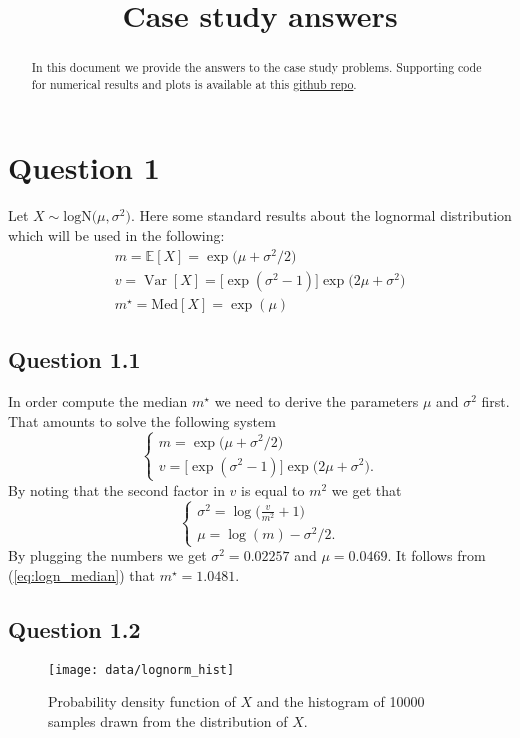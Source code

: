 \documentclass[12pt, a4paper]{article}
\title{Case study answers}
\author{}
\theoremstyle{problemstyle}
\newcommand{\Var}[1]{\operatorname{Var}\left[#1\right]}
\begin{document}
\maketitle

\begin{abstract}
	In this document we provide the answers to the case study problems. Supporting code for numerical results and plots is available at this \href{https://github.com/skiamu/case-study}{github repo}.
\end{abstract}

\section{Question 1}
Let $X \sim \text{logN}\big(\mu, \sigma^2\big)$. Here some standard results about the lognormal distribution which will be used in the following:
\begin{gather}
m =  \mathbb{E}[X]  = \exp\Big(\mu+\sigma^2/2\Big) \\
v=  \Var{X} =  \Big[\exp(\sigma^2-1)\Big]\exp\Big(2\mu+\sigma^2\Big)\\\label{eq:logn_median}
m^{\star} =   \text{Med}[X] = \exp(\mu) 
\end{gather}
\subsection{Question 1.1}
In order compute the median $m^{\star}$ we need to derive the parameters $\mu$ and $\sigma^2$ first. That amounts to solve the following system
\begin{equation}
\begin{cases}
m = \exp\Big(\mu+\sigma^2/2\Big)\\
v = \Big[\exp(\sigma^2-1)\Big]\exp\Big(2\mu+\sigma^2\Big).
\end{cases}
\end{equation}
By noting that the second factor in $v$ is equal to $m^2$ we get that 
\begin{equation}
\begin{cases}
\sigma^2=\log\Big(\frac{v}{m^2}+1\Big)\\
\mu = \log(m) - \sigma^2/2.
\end{cases}
\end{equation}
By plugging the numbers we get $\sigma^2=0.02257$ and $\mu = 0.0469 $. It follows from (\ref{eq:logn_median}) that $m^{\star}=1.0481$.

\subsection{Question 1.2}
\begin{figure}[h]
	\centering
	\texttt{[image: data/lognorm\_hist]}
	\caption{Probability density function of $X$ and the histogram of 10000 samples drawn from the distribution of $X$.}
\end{figure}
\end{document}
